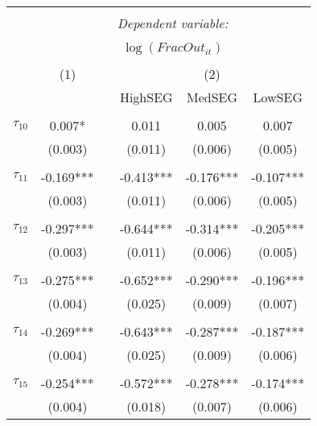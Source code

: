 \begin{tabular}{@{\extracolsep{-5pt}}lccccc} 
\\[-1.8ex]\hline 
\hline \\[-1.8ex] 
 & \multicolumn{5}{c}{\textit{Dependent variable:}} \\ 
\cline{2-6} 
\\[-1.8ex] & \multicolumn{5}{c}{$\log(FracOut_{it})$}\\ 
\\[-1.8ex] & (1) && \multicolumn{3}{c}{(2)} \\ 
\cline{2-2}\cline{4-6}
        &&& HighSEG & MedSEG & LowSEG  \\
 \\[-1.8ex] 
$\tau_{10}$     &  0.007*   &&   0.011   &   0.005   &   0.007   \\
                &  (0.003)  &&  (0.011)  &  (0.006)  &  (0.005)  \\
                &           &&           &           &           \\[-2.1ex]
$\tau_{11}$     & -0.169*** && -0.413*** & -0.176*** & -0.107*** \\
                &  (0.003)  &&  (0.011)  &  (0.006)  &  (0.005)  \\
                &           &&           &           &           \\[-2.1ex]
$\tau_{12}$     & -0.297*** && -0.644*** & -0.314*** & -0.205*** \\
                &  (0.003)  &&  (0.011)  &  (0.006)  &  (0.005)  \\
                &           &&           &           &           \\[-2.1ex]
$\tau_{13}$     & -0.275*** && -0.652*** & -0.290*** & -0.196*** \\
                &  (0.004)  &&  (0.025)  &  (0.009)  &  (0.007)  \\
                &           &&           &           &           \\[-2.1ex]
$\tau_{14}$     & -0.269*** && -0.643*** & -0.287*** & -0.187*** \\
                &  (0.004)  &&  (0.025)  &  (0.009)  &  (0.006)  \\
                &           &&           &           &           \\[-2.1ex]
$\tau_{15}$     & -0.254*** && -0.572*** & -0.278*** & -0.174*** \\
                &  (0.004)  &&  (0.018)  &  (0.007)  &  (0.006)  \\

\end{tabular}
